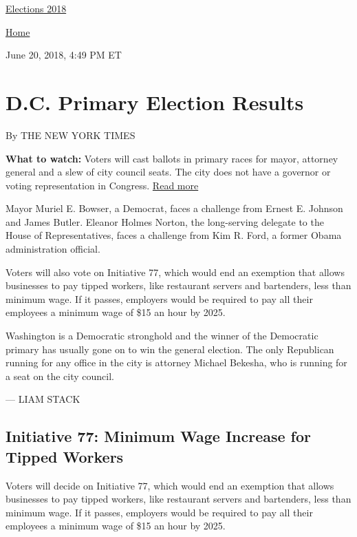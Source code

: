 \href{//www.nytimes3xbfgragh.onion}{}\href{https://www.nytimes3xbfgragh.onion/interactive/2018/us/elections/calendar-primary-results.html}{
Elections 2018}

\href{//www.nytimes3xbfgragh.onion}{ Home}

June 20, 2018, 4:49 PM ET

\hypertarget{dc-primary-election-results}{%
\section{D.C. Primary Election
Results}\label{dc-primary-election-results}}

By THE NEW YORK TIMES

\textbf{What to watch:} Voters will cast ballots in primary races for
mayor, attorney general and a slew of city council seats. The city does
not have a governor or voting representation in Congress.
\protect\hyperlink{}{Read more}

Mayor Muriel E. Bowser, a Democrat, faces a challenge from Ernest E.
Johnson and James Butler. Eleanor Holmes Norton, the long-serving
delegate to the House of Representatives, faces a challenge from Kim R.
Ford, a former Obama administration official.

Voters will also vote on Initiative 77, which would end an exemption
that allows businesses to pay tipped workers, like restaurant servers
and bartenders, less than minimum wage. If it passes, employers would be
required to pay all their employees a minimum wage of \$15 an hour by
2025.

Washington is a Democratic stronghold and the winner of the Democratic
primary has usually gone on to win the general election. The only
Republican running for any office in the city is attorney Michael
Bekesha, who is running for a seat on the city council.

--- LIAM STACK

\hypertarget{initiative-77-minimum-wage-increase-for-tipped-workers}{%
\subsection{Initiative 77: Minimum Wage Increase for Tipped
Workers}\label{initiative-77-minimum-wage-increase-for-tipped-workers}}

Voters will decide on Initiative 77, which would end an exemption that
allows businesses to pay tipped workers, like restaurant servers and
bartenders, less than minimum wage. If it passes, employers would be
required to pay all their employees a minimum wage of \$15 an hour by
2025.

